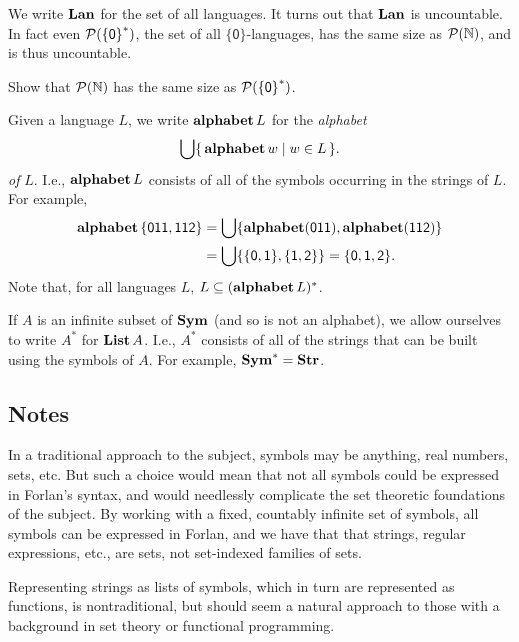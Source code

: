 We write $\mathbf{Lan}$
%
%
for the set of all languages.  It turns out that $\mathbf{Lan}$ is
uncountable.
%
In fact even
${\cal P} (\mathsf{\{0\}}^*)$, the set of all
$\mathsf{\{0\}}$-languages, has the same size as ${\cal P} (\mathbb{N})$,
and is thus uncountable.

\begin{exercise}
Show that ${\cal P} (\mathbb{N})$ has the same size as  ${\cal P} (\mathsf{\{0\}}^*)$.
\end{exercise}

Given a language $L$, we write $\mathbf{alphabet}\,L$
%
%
for the \emph{alphabet}
%
%
\begin{gather*}
\bigcup\{ \, \mathbf{alphabet}\,w \mid w\in L \, \} .
\end{gather*}
\emph{of} $L$.
I.e., $\mathbf{alphabet}\,L$ consists of all of the symbols occurring in the
strings of $L$.
For example,
\begin{align*}
\mathbf{alphabet}\,\mathsf{\{011,112\}} &=
\bigcup\{\mathbf{alphabet}(\mathsf{011}),\mathbf{alphabet}(\mathsf{112})\} \\
&= \bigcup\{\{\mathsf{0},\mathsf{1}\},\{\mathsf{1},\mathsf{2}\}\}
= \{\mathsf{0},\mathsf{1},\mathsf{2}\} .
\end{align*}
Note that, for all languages $L$, $L\subseteq(\mathbf{alphabet}\,L)^*$.

If $A$ is an infinite subset of $\mathbf{Sym}$ (and so is not an alphabet), we
allow ourselves to write $A^*$
%
for $\mathbf{List}\,A$.
I.e., $A^*$ consists of all of the strings that can be built using the
symbols of $A$.  For example, $\mathbf{Sym}^* = \mathbf{Str}$.
%
%
%

\subsection{Notes}

In a traditional approach to the subject, symbols may be anything,
real numbers, sets, etc.  But such a choice would mean that not all
symbols could be expressed in Forlan's syntax, and would needlessly
complicate the set theoretic foundations of the subject.  By working
with a fixed, countably infinite set of symbols, all symbols can be
expressed in Forlan, and we have that that strings, regular
expressions, etc., are sets, not set-indexed families of sets.

Representing strings as lists of symbols, which in turn are
represented as functions, is nontraditional, but should seem a natural
approach to those with a background in set theory or functional
programming.

